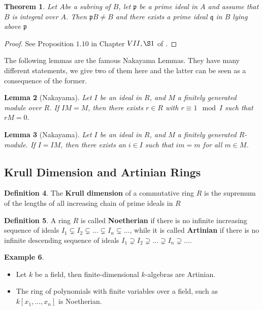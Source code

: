 \documentclass{article}
\theoremstyle{plain}
\newtheorem{theorem}{Theorem}[subsection]
\newtheorem{lemma}[theorem]{Lemma}
\theoremstyle{definition}
\newtheorem{definition}[theorem]{Definition}
\newtheorem{example}[theorem]{Example}
\begin{document}
\begin{theorem}
\label{Lang_1_10}
    Let $A$be a subring of $B$, let $\mathfrak{p}$ be a prime ideal in $A$ and assume that $B$ is integral over $A$. Then $\mathfrak{p}B\neq B$ and there exists a prime ideal $\mathfrak{q}$ in $B$ lying above $\mathfrak{p}$
\end{theorem}
\begin{proof}
    See Proposition $1.10$ in Chapter $VII, \S1$ of \cite{Lang_algebra}.
\end{proof}



\noindent The following lemmas are the famous Nakayama Lemmas. 
They have many different statements, we give two of them here and the latter can be seen as a consequence of the former.
\begin{lemma}[Nakayama]
\label{Nakayama_first_lemma}
     Let $I$ be an ideal in $R$, and $M$ a finitely generated module over $R$.
    If $IM=M$, then there exists $r\in R$ with $r\equiv 1 \mod{I}$ such that $rM=0$.
\end{lemma}


\begin{lemma}[Nakayama]
\label{Nakayama_lemma}
    Let $I$ be an ideal in $R$, and $M$ a finitely generated $R$-module. 
    If $I=IM$, then there exists an $i\in I$ such that $im = m$ for all $m\in M$. 
\end{lemma}




\subsection{Krull Dimension and Artinian Rings}

\begin{definition}
    The \textbf{Krull dimension} of a commutative ring $R$ is the supremum of the lengths of all increasing chain of prime ideals in $R$
\end{definition}


\begin{definition}
    A ring $R$ is called \textbf{Noetherian} if there is no infinite increasing sequence of ideals $I_1\subsetneq I_2 \subsetneq \dots\subsetneq I_n \subsetneq \dots$, while it is called \textbf{Artinian} if there is no infinite descending sequence of ideals $I_1\supsetneq I_2 \supsetneq \dots\supsetneq I_n \supsetneq \dots$.
\end{definition}


\begin{example} \textbf{ }
\label{f_d_k_alg_artinian}
\begin{itemize}
    \item[$a)$] Let $k$ be a field, then finite-dimensional $k$-algebras are Artinian.
    \item[$b)$] The ring of polynomials with finite variables over a field, such as $k[x_1,\dots , x_n]$ is Noetherian.
    \end{itemize}
\end{example}
\end{document}
